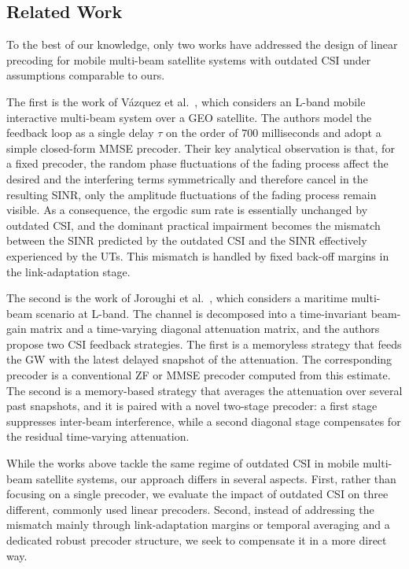 \subsection{Related Work}
\label{subsection:related_work}

To the best of our knowledge, only two works have addressed the design of linear precoding for mobile multi-beam satellite systems with outdated \ac{CSI} under assumptions comparable to ours.

The first is the work of Vázquez et al.~\cite{10_delayed_csi_precoding_for_satellites_spain}, which considers an L-band mobile interactive multi-beam system over a \ac{GEO} satellite. 
The authors model the feedback loop as a single delay $\tau$ on the order of $700$ milliseconds and adopt a simple closed-form \ac{MMSE} precoder.
Their key analytical observation is that, for a fixed precoder, the random phase fluctuations of the fading process affect the desired and the interfering terms symmetrically and therefore cancel in the resulting \ac{SINR}, only the amplitude fluctuations of the fading process remain visible. 
As a consequence, the ergodic sum rate is essentially unchanged by outdated \ac{CSI}, and the dominant practical impairment becomes the mismatch between the \ac{SINR} predicted by the outdated \ac{CSI} and the \ac{SINR} effectively experienced by the \acp{UT}. This mismatch is handled by fixed back-off margins in the link-adaptation stage.

The second is the work of Joroughi et al.~\cite{11_delayed_csi_precoding_for_satellite_luxembourg}, which considers a maritime multi-beam scenario at L-band. 
The channel is decomposed into a time-invariant beam-gain matrix and a time-varying diagonal attenuation matrix, and the authors propose two \ac{CSI} feedback strategies.
The first is a memoryless strategy that feeds the \ac{GW} with the latest delayed snapshot of the attenuation. The corresponding precoder is a conventional \ac{ZF} or \ac{MMSE} precoder computed from this estimate.
The second is a memory-based strategy that averages the attenuation over several past snapshots, and it is paired with a novel two-stage precoder: a first stage suppresses inter-beam interference, while a second diagonal stage compensates for the residual time-varying attenuation.

While the works above tackle the same regime of outdated \ac{CSI} in mobile multi-beam satellite systems, our approach differs in several aspects.
First, rather than focusing on a single precoder, we evaluate the impact of outdated \ac{CSI} on three different, commonly used linear precoders.
Second, instead of addressing the mismatch mainly through link-adaptation margins or temporal averaging and a dedicated robust precoder structure, we seek to compensate it in a more direct way.
